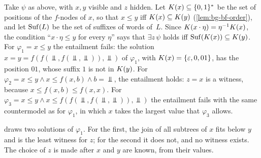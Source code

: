 \begin{example}\label{ex:intro-shift}
Take $\psi$ as above, with $x,y$ visible and $z$ hidden. Let
$K(x)\subseteq\{0,1\}^*$ be the set of positions of the $f$-nodes of $x$,
so that $x\le y$ iff $K(x)\subseteq K(y)$ (\cref{lem:bg-bf-order}), and
let $\operatorname{Suf}(L)$ be the set of suffixes of words of~$L$. Since
$K(x\cdot\eta)=\eta^{-1}K(x)$, the condition ``$x\cdot\eta\le y$ for
every $\eta$'' says that $\exists z\,\psi$ holds iff
$\operatorname{Suf}(K(x))\subseteq K(y)$. For $\varphi_1=x\le y$ the entailment fails:
the solution $x=y=f(f(\Bot,f(\Bot,\Bot)),\Bot)$ of $\varphi_1$, with
$K(x)=\{\varepsilon,0,01\}$, has the position $01$, whose suffix $1$ is not in
$K(y)$. For $\varphi_2=x\le y\wedge x\le f(x,b)\wedge b=\Bot$, the
entailment holds: $z=x$ is a witness, because $x\le f(x,b)\le f(x,x)$. For
$\varphi_3=x\le y\wedge x\le f(f(\Bot,f(\Bot,\Bot)),\Bot)$ the entailment
fails with the same countermodel as for $\varphi_1$, in which $x$ takes the
largest value that $\varphi_3$ allows.
\end{example}

 draws two solutions of $\varphi_1$. For the first, the
join of all subtrees of $x$ fits below $y$ and is the least witness for $z$;
for the second it does not, and no witness exists. The choice of $z$ is made
after $x$ and $y$ are known, from their values.



